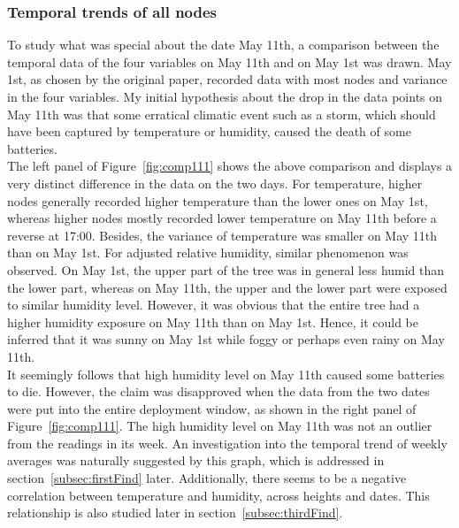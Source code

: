 \documentclass[11pt]{article}
\begin{document}
\subsubsection{Temporal trends of all nodes}
\label{subsubsec:trendAllNodes}
To study what was special about the date May 11th,  a comparison between the temporal data of the four variables on May 11th and on May 1st was drawn. May 1st, as chosen by the original paper, recorded data with most nodes and variance in the four variables. My initial hypothesis about the drop in the data points on May 11th was that some erratical climatic event such as a storm, which should have been captured by temperature or humidity, caused the death of some batteries. \\
The left panel of Figure~\ref{fig:comp111} shows the above comparison and displays a very distinct difference in the data on the two days. For temperature, higher nodes generally recorded higher temperature than the lower ones on May 1st, whereas higher nodes mostly recorded lower temperature on May 11th before a reverse at 17:00. Besides, the variance of temperature was smaller on May 11th than on May 1st. For adjusted relative humidity, similar phenomenon was observed. On May 1st, the upper part of the tree was in general less humid than the lower part, whereas on May 11th, the upper and the lower part were exposed to similar humidity level. However, it was obvious that the entire tree had a higher humidity exposure on May 11th than on May 1st. Hence, it could be inferred that it was sunny on May 1st while foggy or perhaps even rainy on May 11th.\\
It seemingly follows that high humidity level on May 11th caused some batteries to die. However, the claim was disapproved when the data from the two dates were put into the entire deployment window, as shown in the right panel of Figure~\ref{fig:comp111}. The high humidity level on May 11th was not an outlier from the readings in its week. An investigation into the temporal trend of weekly averages was naturally suggested by this graph, which is addressed in section~\ref{subsec:firstFind} later. Additionally, there seems to be a negative correlation between temperature and humidity, across heights and dates. This relationship is also studied later in section~\ref{subsec:thirdFind}.\\
\end{document}

